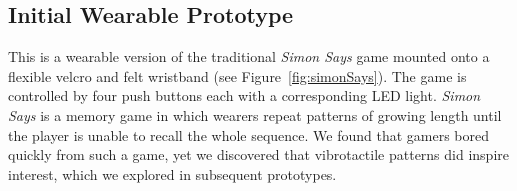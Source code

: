 \documentclass{chi-ext}
\begin{document}

\subsection{Initial Wearable Prototype}
This is a wearable version of the traditional \emph{Simon Says} game mounted onto a flexible velcro and felt wristband (see Figure~\ref{fig:simonSays}). The game is controlled by four push buttons each with a corresponding LED light. \emph{Simon Says} is a memory game in which wearers repeat patterns of growing length until the player is unable to recall the whole sequence. We found that gamers bored quickly from such a game, yet we discovered that vibrotactile patterns did inspire interest, which we explored in subsequent prototypes. 



\end{document}
